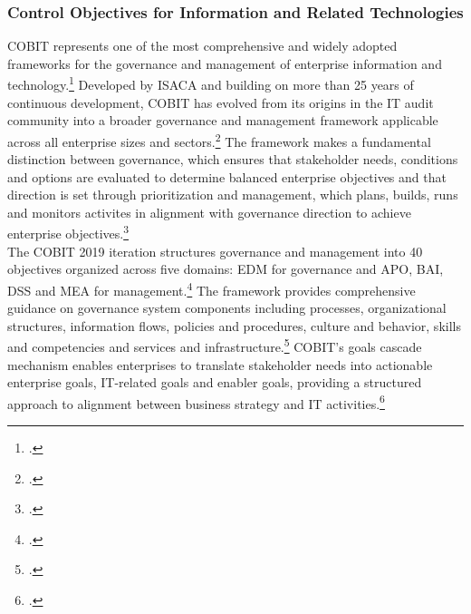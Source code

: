 \subsubsection{Control Objectives for Information and Related Technologies}
\label{subsubsec:COBIT2019}
\ac{COBIT} represents one of the most comprehensive and widely adopted frameworks for the governance and management of enterprise information and technology.\footcite[13]{isacaCOBIT2019Framework2018}
Developed by \ac{ISACA} and building on more than 25 years of continuous development, \ac{COBIT} has evolved from its origins in the IT audit community into a broader governance and management framework applicable across all enterprise sizes and sectors.\footcite[2]{informationsystemsauditandcontrolassociationCOBIT5Business2012}
The framework makes a fundamental distinction between governance, which ensures that stakeholder needs, conditions and options are evaluated to determine balanced enterprise objectives and that direction is set through prioritization and management, which plans, builds, runs and monitors activites in alignment with governance direction to achieve enterprise objectives.\footcite[13]{isacaCOBIT2019Framework2018}
\\
The \ac{COBIT} 2019 iteration structures governance and management into 40 objectives organized across five domains: \ac{EDM} for governance and \ac{APO}, \ac{BAI}, \ac{DSS} and \ac{MEA} for management.\footcite[17]{isacaCOBIT2019Framework2018a}
The framework provides comprehensive guidance on governance system components including processes, organizational structures, information flows, policies and procedures, culture and behavior, skills and competencies and services and infrastructure.\footcite[21-22]{isacaCOBIT2019Framework2018}
COBIT's goals cascade mechanism enables enterprises to translate stakeholder needs into actionable enterprise goals, IT-related goals and enabler goals, providing a structured approach to alignment between business strategy and IT activities.\footcite[17-18]{informationsystemsauditandcontrolassociationCOBIT5Business2012}

